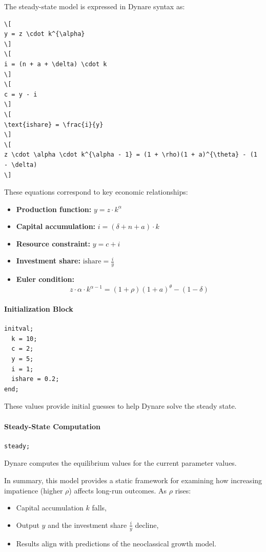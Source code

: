 \documentclass[12pt,a4paper,notitlepage]{article}
\numberwithin{equation}{section}
\begin{document}
\begin{itemize}
The steady-state model is expressed in Dynare syntax as:
\begin{lstlisting}
\[
y = z \cdot k^{\alpha}
\]
\[
i = (n + a + \delta) \cdot k
\]
\[
c = y - i
\]
\[
\text{ishare} = \frac{i}{y}
\]
\[
z \cdot \alpha \cdot k^{\alpha - 1} = (1 + \rho)(1 + a)^{\theta} - (1 - \delta)
\]

\end{lstlisting}

These equations correspond to key economic relationships:
\begin{itemize}
  \item \textbf{Production function:} \( y = z \cdot k^\alpha \)
  \item \textbf{Capital accumulation:} \( i = (\delta + n + a) \cdot k \)
  \item \textbf{Resource constraint:} \( y = c + i \)
  \item \textbf{Investment share:} \( \text{ishare} = \frac{i}{y} \)
  \item \textbf{Euler condition:}
  \[
  z \cdot \alpha \cdot k^{\alpha - 1} = (1 + \rho)(1 + a)^\theta - (1 - \delta)
  \]
\end{itemize}

\paragraph{Initialization Block}
\begin{lstlisting}
initval;
  k = 10;
  c = 2;
  y = 5;
  i = 1;
  ishare = 0.2;
end;
\end{lstlisting}
These values provide initial guesses to help Dynare solve the steady state.

\paragraph{Steady-State Computation}
\begin{lstlisting}
steady;
\end{lstlisting}
Dynare computes the equilibrium values for the current parameter values.

\vspace{1em}
In summary, this model provides a static framework for examining how increasing impatience (higher \( \rho \)) affects long-run outcomes. As \( \rho \) rises:
\begin{itemize}
  \item Capital accumulation \( k \) falls,
  \item Output \( y \) and the investment share \( \frac{i}{y} \) decline,
  \item Results align with predictions of the neoclassical growth model.
\end{itemize}









\end{itemize}
\end{document}
